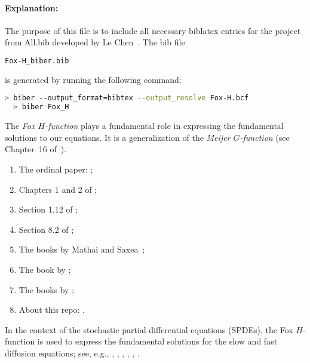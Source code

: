 \documentclass{article}
\begin{document}
\paragraph{Explanation:}


The purpose of this file is to include all necessary biblatex entries  for the
project  from All.bib developed by Le Chen~\cite{chen:23:spdes-bib}. The bib
file

\begin{lstlisting}[language=bash]
   Fox-H_biber.bib
\end{lstlisting}

is generated by running the following command:

\begin{lstlisting}[language=bash]
  > biber --output_format=bibtex --output_resolve Fox-H.bcf
  > biber Fox_H
\end{lstlisting}

The \textit{Fox $H$-function} plays a fundamental role in expressing the
fundamental solutions to our equations. It is a generalization of the
\textit{Meijer $G$-function} (see Chapter~16 of~\cite{olver.lozier.ea:10:nist}). 

\begin{enumerate}
  \item The ordinal paper: \cite{fox:61:g};
  \item Chapters 1 and 2 of \cite{kilbas.saigo:04:h-transforms};
  \item Section 1.12 of \cite{kilbas.srivastava.ea:06:theory};
  \item Section 8.2 of \cite{prudnikov.brychkov.ea:90:integrals};
  \item The books by Mathai and Saxea~\cite{mathai.saxena.ea:10:h-function,
    mathai.saxena:78:h-function};
  \item The book by \cite{eidelman.ivasyshen.ea:04:analytic};
  \item The books by \cite{erdelyi.magnus.ea:81:higher*1,erdelyi.magnus.ea:81:higher*2};
  \item About this repo: \cite{chen.hu:23:some}.
\end{enumerate}

In the context of the stochastic partial differential equations (SPDEs), the Fox
$H$-function is used to express the fundamental solutions for the slow and fast
diffusion equations; see, e.g., \cite{chen.hu.ea:17:space-time},
\cite{chen.hu.ea:19:nonlinear}, \cite{chen.eisenberg:22:interpolating},
\cite{chen.hu:22:holder}, \cite{chen.guo.ea:22:moments},
\cite{mijena.nane:15:space-time}.

\printbibliography[title={References}]
\end{document}
